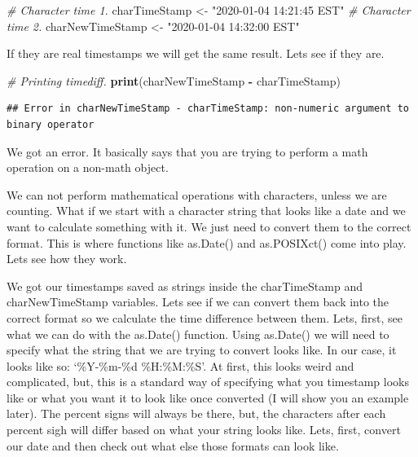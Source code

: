 \documentclass[]{book}
\newenvironment{Shaded}{\begin{snugshade}}{\end{snugshade}}
\newcommand{\CommentTok}[1]{\textcolor[rgb]{0.56,0.35,0.01}{\textit{#1}}}
\newcommand{\KeywordTok}[1]{\textcolor[rgb]{0.13,0.29,0.53}{\textbf{#1}}}
\newcommand{\NormalTok}[1]{#1}
\newcommand{\OperatorTok}[1]{\textcolor[rgb]{0.81,0.36,0.00}{\textbf{#1}}}
\newcommand{\StringTok}[1]{\textcolor[rgb]{0.31,0.60,0.02}{#1}}
\begin{document}
\begin{Shaded}
\begin{Highlighting}[]
\CommentTok{# Character time 1.}
\NormalTok{charTimeStamp <-}\StringTok{ "2020-01-04 14:21:45 EST"}
\CommentTok{# Character time 2.}
\NormalTok{charNewTimeStamp <-}\StringTok{ "2020-01-04 14:32:00 EST"}
\end{Highlighting}
\end{Shaded}

If they are real timestamps we will get the same result. Lets see if they are.

\begin{Shaded}
\begin{Highlighting}[]
\CommentTok{# Printing timediff.}
\KeywordTok{print}\NormalTok{(charNewTimeStamp }\OperatorTok{-}\StringTok{ }\NormalTok{charTimeStamp)}
\end{Highlighting}
\end{Shaded}

\begin{verbatim}
## Error in charNewTimeStamp - charTimeStamp: non-numeric argument to binary operator
\end{verbatim}

We got an error. It basically says that you are trying to perform a math operation on a non-math object.

We can not perform mathematical operations with characters, unless we are counting. What if we start with a character string that looks like a date and we want to calculate something with it. We just need to convert them to the correct format. This is where functions like as.Date() and as.POSIXct() come into play. Lets see how they work.

We got our timestamps saved as strings inside the charTimeStamp and charNewTimeStamp variables. Lets see if we can convert them back into the correct format so we calculate the time difference between them. Lets, first, see what we can do with the as.Date() function. Using as.Date() we will need to specify what the string that we are trying to convert looks like. In our case, it looks like so: `\%Y-\%m-\%d \%H:\%M:\%S'. At first, this looks weird and complicated, but, this is a standard way of specifying what you timestamp looks like or what you want it to look like once converted (I will show you an example later). The percent signs will always be there, but, the characters after each percent sigh will differ based on what your string looks like. Lets, first, convert our date and then check out what else those formats can look like.
\end{document}
